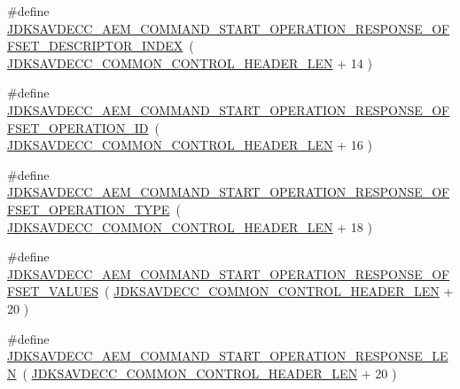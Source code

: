 \begin{DoxyCompactItemize}
\item 
\#define \hyperlink{group__command__start__operation__response_ga8036adfde7c233b8644302b41add36b3}{J\+D\+K\+S\+A\+V\+D\+E\+C\+C\+\_\+\+A\+E\+M\+\_\+\+C\+O\+M\+M\+A\+N\+D\+\_\+\+S\+T\+A\+R\+T\+\_\+\+O\+P\+E\+R\+A\+T\+I\+O\+N\+\_\+\+R\+E\+S\+P\+O\+N\+S\+E\+\_\+\+O\+F\+F\+S\+E\+T\+\_\+\+D\+E\+S\+C\+R\+I\+P\+T\+O\+R\+\_\+\+I\+N\+D\+EX}~( \hyperlink{group__jdksavdecc__avtp__common__control__header_gaae84052886fb1bb42f3bc5f85b741dff}{J\+D\+K\+S\+A\+V\+D\+E\+C\+C\+\_\+\+C\+O\+M\+M\+O\+N\+\_\+\+C\+O\+N\+T\+R\+O\+L\+\_\+\+H\+E\+A\+D\+E\+R\+\_\+\+L\+EN} + 14 )
\item 
\#define \hyperlink{group__command__start__operation__response_gae41f0589003673d10722ea2919fe3fb5}{J\+D\+K\+S\+A\+V\+D\+E\+C\+C\+\_\+\+A\+E\+M\+\_\+\+C\+O\+M\+M\+A\+N\+D\+\_\+\+S\+T\+A\+R\+T\+\_\+\+O\+P\+E\+R\+A\+T\+I\+O\+N\+\_\+\+R\+E\+S\+P\+O\+N\+S\+E\+\_\+\+O\+F\+F\+S\+E\+T\+\_\+\+O\+P\+E\+R\+A\+T\+I\+O\+N\+\_\+\+ID}~( \hyperlink{group__jdksavdecc__avtp__common__control__header_gaae84052886fb1bb42f3bc5f85b741dff}{J\+D\+K\+S\+A\+V\+D\+E\+C\+C\+\_\+\+C\+O\+M\+M\+O\+N\+\_\+\+C\+O\+N\+T\+R\+O\+L\+\_\+\+H\+E\+A\+D\+E\+R\+\_\+\+L\+EN} + 16 )
\item 
\#define \hyperlink{group__command__start__operation__response_gad8d857eaf78c7595e42083bbc6b8ae4e}{J\+D\+K\+S\+A\+V\+D\+E\+C\+C\+\_\+\+A\+E\+M\+\_\+\+C\+O\+M\+M\+A\+N\+D\+\_\+\+S\+T\+A\+R\+T\+\_\+\+O\+P\+E\+R\+A\+T\+I\+O\+N\+\_\+\+R\+E\+S\+P\+O\+N\+S\+E\+\_\+\+O\+F\+F\+S\+E\+T\+\_\+\+O\+P\+E\+R\+A\+T\+I\+O\+N\+\_\+\+T\+Y\+PE}~( \hyperlink{group__jdksavdecc__avtp__common__control__header_gaae84052886fb1bb42f3bc5f85b741dff}{J\+D\+K\+S\+A\+V\+D\+E\+C\+C\+\_\+\+C\+O\+M\+M\+O\+N\+\_\+\+C\+O\+N\+T\+R\+O\+L\+\_\+\+H\+E\+A\+D\+E\+R\+\_\+\+L\+EN} + 18 )
\item 
\#define \hyperlink{group__command__start__operation__response_ga9b17f63d37ba14051b5bf828ead58c6e}{J\+D\+K\+S\+A\+V\+D\+E\+C\+C\+\_\+\+A\+E\+M\+\_\+\+C\+O\+M\+M\+A\+N\+D\+\_\+\+S\+T\+A\+R\+T\+\_\+\+O\+P\+E\+R\+A\+T\+I\+O\+N\+\_\+\+R\+E\+S\+P\+O\+N\+S\+E\+\_\+\+O\+F\+F\+S\+E\+T\+\_\+\+V\+A\+L\+U\+ES}~( \hyperlink{group__jdksavdecc__avtp__common__control__header_gaae84052886fb1bb42f3bc5f85b741dff}{J\+D\+K\+S\+A\+V\+D\+E\+C\+C\+\_\+\+C\+O\+M\+M\+O\+N\+\_\+\+C\+O\+N\+T\+R\+O\+L\+\_\+\+H\+E\+A\+D\+E\+R\+\_\+\+L\+EN} + 20 )
\item 
\#define \hyperlink{group__command__start__operation__response_gabdd28d33ec415afbbbd708e880885824}{J\+D\+K\+S\+A\+V\+D\+E\+C\+C\+\_\+\+A\+E\+M\+\_\+\+C\+O\+M\+M\+A\+N\+D\+\_\+\+S\+T\+A\+R\+T\+\_\+\+O\+P\+E\+R\+A\+T\+I\+O\+N\+\_\+\+R\+E\+S\+P\+O\+N\+S\+E\+\_\+\+L\+EN}~( \hyperlink{group__jdksavdecc__avtp__common__control__header_gaae84052886fb1bb42f3bc5f85b741dff}{J\+D\+K\+S\+A\+V\+D\+E\+C\+C\+\_\+\+C\+O\+M\+M\+O\+N\+\_\+\+C\+O\+N\+T\+R\+O\+L\+\_\+\+H\+E\+A\+D\+E\+R\+\_\+\+L\+EN} + 20 )
\end{DoxyCompactItemize}
